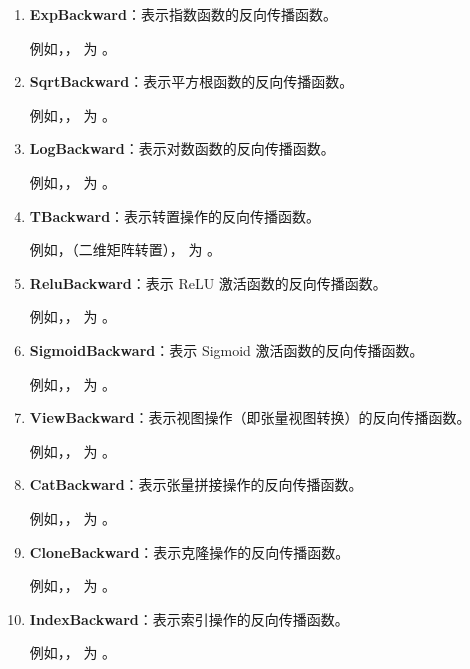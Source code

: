 \begin{enumerate}[label=\arabic*)]
    \item \textbf{ExpBackward}：表示指数函数的反向传播函数。
    
    例如，， 为 。

    \item \textbf{SqrtBackward}：表示平方根函数的反向传播函数。
    
    例如，， 为 。

    \item \textbf{LogBackward}：表示对数函数的反向传播函数。
    
    例如，， 为 。

    \item \textbf{TBackward}：表示转置操作的反向传播函数。
    
    例如，（二维矩阵转置）， 为 。

    \item \textbf{ReluBackward}：表示 ReLU 激活函数的反向传播函数。
    
    例如，， 为 。

    \item \textbf{SigmoidBackward}：表示 Sigmoid 激活函数的反向传播函数。
    
    例如，， 为 。

    \item \textbf{ViewBackward}：表示视图操作（即张量视图转换）的反向传播函数。
    
    例如，， 为 。

    \item \textbf{CatBackward}：表示张量拼接操作的反向传播函数。
    
    例如，， 为 。

    \item \textbf{CloneBackward}：表示克隆操作的反向传播函数。
    
    例如，， 为 。

    \item \textbf{IndexBackward}：表示索引操作的反向传播函数。
    
    例如，， 为 。
\end{enumerate}

